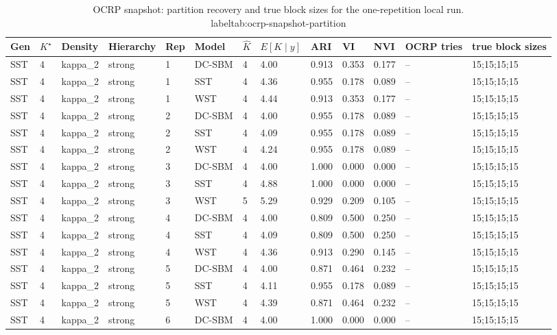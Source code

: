\begin{table}[!h]
\centering
\caption{OCRP snapshot: partition recovery and true block sizes for the one-repetition local run.\\label{tab:ocrp-snapshot-partition}}
\centering
\begin{tabular}[t]{lllllllllllll}
\toprule
Gen & $K^\star$ & Density & Hierarchy & Rep & Model & $\hat K$ & $E[K\mid y]$ & ARI & VI & NVI & OCRP tries & true block sizes\\
\midrule
SST & 4 & kappa_2 & strong & 1 & DC-SBM & 4 & 4.00 & 0.913 & 0.353 & 0.177 & -- & 15;15;15;15\\
SST & 4 & kappa_2 & strong & 1 & SST & 4 & 4.36 & 0.955 & 0.178 & 0.089 & -- & 15;15;15;15\\
SST & 4 & kappa_2 & strong & 1 & WST & 4 & 4.44 & 0.913 & 0.353 & 0.177 & -- & 15;15;15;15\\
SST & 4 & kappa_2 & strong & 2 & DC-SBM & 4 & 4.00 & 0.955 & 0.178 & 0.089 & -- & 15;15;15;15\\
SST & 4 & kappa_2 & strong & 2 & SST & 4 & 4.09 & 0.955 & 0.178 & 0.089 & -- & 15;15;15;15\\
SST & 4 & kappa_2 & strong & 2 & WST & 4 & 4.24 & 0.955 & 0.178 & 0.089 & -- & 15;15;15;15\\
SST & 4 & kappa_2 & strong & 3 & DC-SBM & 4 & 4.00 & 1.000 & 0.000 & 0.000 & -- & 15;15;15;15\\
SST & 4 & kappa_2 & strong & 3 & SST & 4 & 4.88 & 1.000 & 0.000 & 0.000 & -- & 15;15;15;15\\
SST & 4 & kappa_2 & strong & 3 & WST & 5 & 5.29 & 0.929 & 0.209 & 0.105 & -- & 15;15;15;15\\
SST & 4 & kappa_2 & strong & 4 & DC-SBM & 4 & 4.00 & 0.809 & 0.500 & 0.250 & -- & 15;15;15;15\\
SST & 4 & kappa_2 & strong & 4 & SST & 4 & 4.09 & 0.809 & 0.500 & 0.250 & -- & 15;15;15;15\\
SST & 4 & kappa_2 & strong & 4 & WST & 4 & 4.36 & 0.913 & 0.290 & 0.145 & -- & 15;15;15;15\\
SST & 4 & kappa_2 & strong & 5 & DC-SBM & 4 & 4.00 & 0.871 & 0.464 & 0.232 & -- & 15;15;15;15\\
SST & 4 & kappa_2 & strong & 5 & SST & 4 & 4.11 & 0.955 & 0.178 & 0.089 & -- & 15;15;15;15\\
SST & 4 & kappa_2 & strong & 5 & WST & 4 & 4.39 & 0.871 & 0.464 & 0.232 & -- & 15;15;15;15\\
SST & 4 & kappa_2 & strong & 6 & DC-SBM & 4 & 4.00 & 1.000 & 0.000 & 0.000 & -- & 15;15;15;15\\

\end{tabular}
\end{table}
